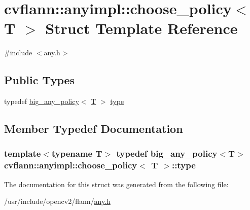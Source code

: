 \hypertarget{structcvflann_1_1anyimpl_1_1choose__policy}{\section{cvflann\-:\-:anyimpl\-:\-:choose\-\_\-policy$<$ T $>$ Struct Template Reference}
\label{structcvflann_1_1anyimpl_1_1choose__policy}
}


{\ttfamily \#include $<$any.\-h$>$}

\subsection*{Public Types}
\begin{DoxyCompactItemize}
\item 
typedef \hyperlink{structcvflann_1_1anyimpl_1_1big__any__policy}{big\-\_\-any\-\_\-policy}$<$ \hyperlink{calib3d_8hpp_a3efb9551a871ddd0463079a808916717}{T} $>$ \hyperlink{structcvflann_1_1anyimpl_1_1choose__policy_ad27dc43a86083ecdfc5d33fb108127b2}{type}
\end{DoxyCompactItemize}


\subsection{Member Typedef Documentation}
\hypertarget{structcvflann_1_1anyimpl_1_1choose__policy_ad27dc43a86083ecdfc5d33fb108127b2}{
\subsubsection[{type}]{\setlength{\rightskip}{0pt plus 5cm}template$<$typename T$>$ typedef {\bf big\-\_\-any\-\_\-policy}$<${\bf T}$>$ {\bf cvflann\-::anyimpl\-::choose\-\_\-policy}$<$ {\bf T} $>$\-::{\bf type}}}\label{structcvflann_1_1anyimpl_1_1choose__policy_ad27dc43a86083ecdfc5d33fb108127b2}


The documentation for this struct was generated from the following file\-:\begin{DoxyCompactItemize}
\item 
/usr/include/opencv2/flann/\hyperlink{any_8h}{any.\-h}\end{DoxyCompactItemize}
